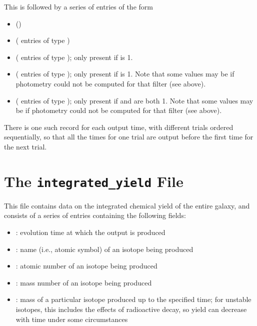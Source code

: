 \documentclass[letterpaper,10pt,english]{sphinxmanual}
\begin{document}
This is followed by a series of entries of the form
\begin{itemize}
\item {} 
 ()

\item {} 
 ( entries of type )

\item {} 
 ( entries of type ); only present if  is 1.

\item {} 
 ( entries of type ); only present if  is 1. Note that some values may be  if photometry could not be computed for that filter (see above).

\item {} 
 ( entries of type ); only present if  and  are both 1. Note that some values may be  if photometry could not be computed for that filter (see above).

\end{itemize}

There is one such record for each output time, with different trials ordered sequentially, so that all the times for one trial are output before the first time for the next trial.


\section{The \texttt{integrated\_yield} File}
\label{output:the-integrated-yield-file}\label{output:ssec-int-yield-file}
This file contains data on the integrated chemical yield of the entire
galaxy, and consists of a series of entries containing the following
fields:
\begin{itemize}
\item {} 
: evolution time at which the output is produced

\item {} 
: name (i.e., atomic symbol) of an isotope being produced

\item {} 
: atomic number of an isotope being produced

\item {} 
: mass number of an isotope being produced

\item {} 
: mass of a particular isotope produced up to the specified time; for unstable isotopes, this includes the effects of radioactive decay, so yield can decrease with time under some circumstances

\end{itemize}
\end{document}
